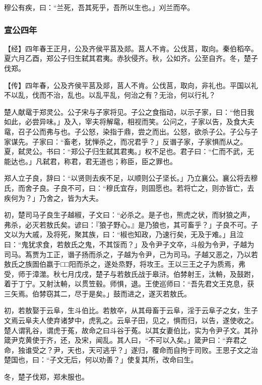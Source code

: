 \documentclass[]{article}
\begin{document}
穆公有疾，曰：``兰死，吾其死乎，吾所以生也。」刈兰而卒。

\hypertarget{header-n1335}{%
\subsubsection{宣公四年}\label{header-n1335}}

【经】四年春王正月，公及齐侯平莒及郯。莒人不肯。公伐莒，取向。秦伯稻卒。夏六月乙酉，郑公子归生弑其君夷。赤狄侵齐。秋，公如齐。公至自齐。冬，楚子伐郑。

【传】四年春，公及齐侯平莒及郯，莒人不肯。公伐莒，取向，非礼也。平国以礼不以乱，伐而不治，乱也。以乱平乱，何治之有？无治，何以行礼？

楚人献鼋于郑灵公。公子宋与子家将见。子公之食指动，以示子家，曰：``他日我如此，必尝异味。」及入，宰夫将解鼋，相视而笑。公问之，子家以告，及食大夫鼋，召子公而弗与也。子公怒，染指于鼎，尝之而出。公怒，欲杀子公。子公与子家谋先。子家曰：``畜老，犹惮杀之，而况君乎？」反谮子家，子家惧而从之。夏，弑灵公。书曰：``郑公子归生弑其君夷。」权不足也。君子曰：``仁而不武，无能达也。」凡弑君，称君，君无道也；称臣，臣之罪也。

郑人立子良，辞曰：``以贤则去疾不足，以顺则公子坚长。」乃立襄公。襄公将去穆氏，而舍子良。子良不可，曰：``穆氏宜存，则固愿也。若将亡之，则亦皆亡，去疾何为？」乃舍之，皆为大夫。

初，楚司马子良生子越椒，子文曰：``必杀之。是子也，熊虎之状，而豺狼之声，弗杀，必灭若敖氏矣。谚曰：『狼子野心。』是乃狼也，其可畜乎？」子良不可。子文以为大戚，及将死，聚其族，曰：``椒也知政，乃速行矣，无及于难。」且泣曰：``鬼犹求食，若敖氏之鬼，不其馁而？」及令尹子文卒，斗般为令尹，子越为司马。蒍贾为工正，谮子扬而杀之，子越为令尹，己为司马。子越又恶之，乃以若敖氏之族圄伯嬴于□□阳而杀之，遂处烝野，将攻王。王以三王之子为质焉，弗受，师于漳澨。秋七月戊戌，楚子与若敖氏战于皋浒。伯棼射王，汰輈，及鼓跗，着于丁宁。又射汰輈，以贯笠毂。师惧，退。王使巡师曰：``吾先君文王克息，获三矢焉。伯棼窃其二，尽于是矣。」鼓而进之，遂灭若敖氏。

初，若敖娶于云阜，生斗伯比。若敖卒，从其母畜于云阜，淫于云阜子之女，生子文焉云阜夫人使弃诸梦中，虎乳之。云阜子田，见之，惧而归，以告，遂使收之。楚人谓乳谷，谓虎于菟，故命之曰斗谷于菟。以其女妻伯比，实为令尹子文。其孙箴尹克黄使于齐，还，及宋，闻乱。其人曰，``不可以入矣。」箴尹曰：``弃君之命，独谁受之？尹，天也，天可逃乎？」遂归，覆命而自拘于司败。王思子文之治楚国也，曰：``子文无后，何以劝善？」使复其所，改命曰生。

冬，楚子伐郑，郑未服也。
\end{document}
